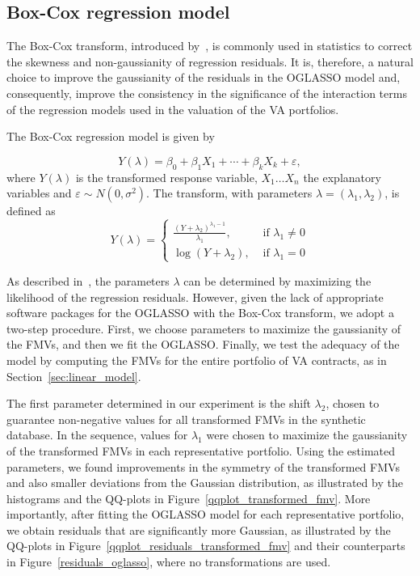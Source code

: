\subsection{Box-Cox regression model}

The Box-Cox transform, introduced by~\cite{box1964analysis}, is commonly used in statistics to correct the skewness and non-gaussianity of regression residuals. It is, therefore, a natural choice to improve the gaussianity of the residuals in the OGLASSO model and, consequently, improve the consistency in the significance of the interaction terms of the regression models used in the valuation of the VA portfolios.

The Box-Cox regression model is given by 

\begin{equation}
 Y(\lambda)=\beta_{0}+\beta_{1} X_{1}+\cdots+\beta_{k} X_{k}+\varepsilon,
\end{equation}
where $Y\left(\lambda \right)$ is the transformed response variable, $X_1 \ldots X_n$ the explanatory variables and $\varepsilon \sim N(0,\sigma^2)$. The transform, with parameters 
$\lambda=(\lambda_1, \lambda_2)$, is defined as 
\begin{equation}\label{boxcox}
 Y({\lambda})=\left\{\begin{array}{ll}{\frac{\left(Y+\lambda_{2}\right)^{\lambda_{1}-1}}{\lambda_{1}},} & {\text { if } \lambda_{1} \neq 0} \\ {\log \left(Y+\lambda_{2}\right),} & {\text { if } \lambda_{1}=0}\end{array}\right.
\end{equation}

As described in~\cite{box1964analysis}, the parameters $\lambda$ can be determined by maximizing the likelihood of the regression residuals. However, given the lack of appropriate software packages for the OGLASSO with the Box-Cox transform, we adopt a two-step procedure. First, we choose parameters to maximize the gaussianity of the FMVs, and then we fit the OGLASSO. Finally, we test the adequacy of the model by computing the FMVs for the entire portfolio of VA contracts, as in Section~\ref{sec:linear_model}.

The first parameter determined in our experiment is the shift $\lambda_2$, chosen to guarantee non-negative values for all transformed FMVs in the synthetic database. In the sequence,  values for $\lambda_1$ were chosen to maximize the gaussianity of the transformed FMVs in each representative portfolio. Using the estimated parameters, we found improvements in the symmetry of the transformed FMVs and also smaller deviations from the Gaussian distribution, as illustrated by the histograms and the QQ-plots in Figure~\ref{qqplot_transformed_fmv}. More importantly, after fitting the OGLASSO model for each representative portfolio, we obtain residuals that are significantly more Gaussian, as illustrated by the QQ-plots in Figure~\ref{qqplot_residuals_transformed_fmv} and their counterparts in Figure~\ref{residuals_oglasso}, where no transformations are used. 


